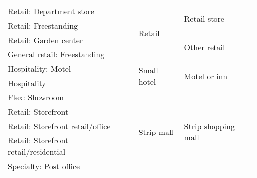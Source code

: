 \begin{table}
\begin{tabular}{|p{4.25cm}|p{3.5cm}|p{3.25cm}|p{4.25cm}|}
Retail: Department store                              &                                                 & \multirow{4}{*}{Retail}                   & \multirow{2}{*}{Retail store}                   \\ \cline{1-1}
Retail: Freestanding                                  &                                                 &                                           &                                                 \\ \cline{1-1} \cline{4-4} 
Retail: Garden center                                 &                                                 &                                           & \multirow{2}{*}{Other retail}                   \\ \cline{1-1}
General retail: Freestanding                          &                                                 &                                           &                                                 \\ \cline{1-1} \cline{3-4} 
Hospitality: Motel                                    &                                                 & \multirow{2}{*}{Small hotel}              & \multirow{2}{*}{Motel or inn}                   \\ \cline{1-1}
Hospitality                                           &                                                 &                                           &                                                 \\ \cline{1-1} \cline{3-4} 
Flex: Showroom                                        &                                                 & \multirow{7}{*}{Strip mall}               & \multirow{7}{*}{Strip shopping mall}            \\ \cline{1-1}
Retail: Storefront                                    &                                                 &                                           &                                                 \\ \cline{1-1}
Retail: Storefront   retail/office                    &                                                 &                                           &                                                 \\ \cline{1-1}
Retail: Storefront   retail/residential               &                                                 &                                           &                                                 \\ \cline{1-1}
Specialty: Post office                                &                                                 &                                           &                                                 \\ \cline{1-1}

\end{tabular}
\end{table}
